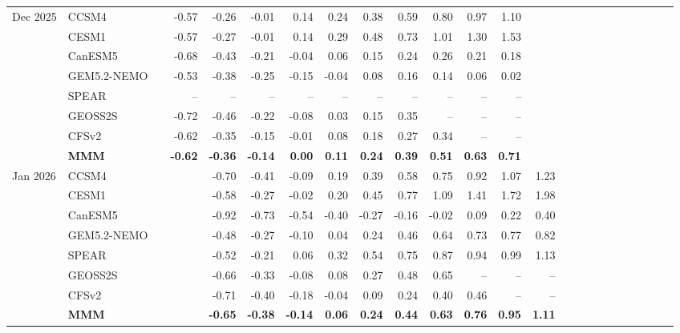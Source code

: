 \documentclass{article}
\begin{document}
\begin{longtable}{llrrrrrrrrrrrrrrrrrrrrrr}
\midrule
Dec 2025 & CCSM4 &  & -0.57 & -0.26 & -0.01 & 0.14 & 0.24 & 0.38 & 0.59 & 0.80 & 0.97 & 1.10 &  &  &  &  &  &  &  &  &  &  &  \\
 & CESM1 &  & -0.57 & -0.27 & -0.01 & 0.14 & 0.29 & 0.48 & 0.73 & 1.01 & 1.30 & 1.53 &  &  &  &  &  &  &  &  &  &  &  \\
 & CanESM5 &  & -0.68 & -0.43 & -0.21 & -0.04 & 0.06 & 0.15 & 0.24 & 0.26 & 0.21 & 0.18 &  &  &  &  &  &  &  &  &  &  &  \\
 & GEM5.2-NEMO &  & -0.53 & -0.38 & -0.25 & -0.15 & -0.04 & 0.08 & 0.16 & 0.14 & 0.06 & 0.02 &  &  &  &  &  &  &  &  &  &  &  \\
 & SPEAR &  & -- & -- & -- & -- & -- & -- & -- & -- & -- & -- &  &  &  &  &  &  &  &  &  &  &  \\
 & GEOSS2S &  & -0.72 & -0.46 & -0.22 & -0.08 & 0.03 & 0.15 & 0.35 & -- & -- & -- &  &  &  &  &  &  &  &  &  &  &  \\
 & CFSv2 &  & -0.62 & -0.35 & -0.15 & -0.01 & 0.08 & 0.18 & 0.27 & 0.34 & -- & -- &  &  &  &  &  &  &  &  &  &  &  \\
 & \textbf{MMM} &  & \textbf{-0.62} & \textbf{-0.36} & \textbf{-0.14} & \textbf{0.00} & \textbf{0.11} & \textbf{0.24} & \textbf{0.39} & \textbf{0.51} & \textbf{0.63} & \textbf{0.71} &  &  &  &  &  &  &  &  &  &  &  \\
\midrule
Jan 2026 & CCSM4 &  &  & -0.70 & -0.41 & -0.09 & 0.19 & 0.39 & 0.58 & 0.75 & 0.92 & 1.07 & 1.23 &  &  &  &  &  &  &  &  &  &  \\
 & CESM1 &  &  & -0.58 & -0.27 & -0.02 & 0.20 & 0.45 & 0.77 & 1.09 & 1.41 & 1.72 & 1.98 &  &  &  &  &  &  &  &  &  &  \\
 & CanESM5 &  &  & -0.92 & -0.73 & -0.54 & -0.40 & -0.27 & -0.16 & -0.02 & 0.09 & 0.22 & 0.40 &  &  &  &  &  &  &  &  &  &  \\
 & GEM5.2-NEMO &  &  & -0.48 & -0.27 & -0.10 & 0.04 & 0.24 & 0.46 & 0.64 & 0.73 & 0.77 & 0.82 &  &  &  &  &  &  &  &  &  &  \\
 & SPEAR &  &  & -0.52 & -0.21 & 0.06 & 0.32 & 0.54 & 0.75 & 0.87 & 0.94 & 0.99 & 1.13 &  &  &  &  &  &  &  &  &  &  \\
 & GEOSS2S &  &  & -0.66 & -0.33 & -0.08 & 0.08 & 0.27 & 0.48 & 0.65 & -- & -- & -- &  &  &  &  &  &  &  &  &  &  \\
 & CFSv2 &  &  & -0.71 & -0.40 & -0.18 & -0.04 & 0.09 & 0.24 & 0.40 & 0.46 & -- & -- &  &  &  &  &  &  &  &  &  &  \\
 & \textbf{MMM} &  &  & \textbf{-0.65} & \textbf{-0.38} & \textbf{-0.14} & \textbf{0.06} & \textbf{0.24} & \textbf{0.44} & \textbf{0.63} & \textbf{0.76} & \textbf{0.95} & \textbf{1.11} &  &  &  &  &  &  &  &  &  &  \\

\end{longtable}
\end{document}
